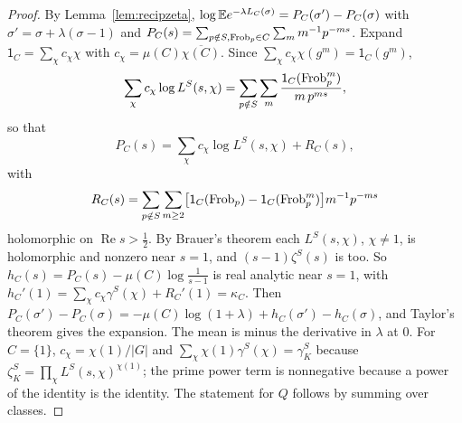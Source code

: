 \begin{proof}
By Lemma~\ref{lem:recipzeta}, $\log\mathbb{E} e^{-\lambda L_C(\sigma)}=P_C(\sigma')-P_C(\sigma)$ with $\sigma'=\sigma+\lambda(\sigma-1)$ and $P_C(s)=\sum_{p\notin S,\operatorname{Frob}_p\in C}\sum_mm^{-1}p^{-ms}$. Expand $\mathsf 1_C=\sum_\chi c_\chi\chi$ with $c_\chi=\mu(C)\overline{\chi(C)}$. Since $\sum_\chi c_\chi\chi(g^m)=\mathsf 1_C(g^m)$,
\[
\sum_\chi c_\chi\log L^S(s,\chi)=\sum_{p\notin S}\sum_m\frac{\mathsf 1_C(\operatorname{Frob}_p^m)}{m\,p^{ms}},
\]
so that
\[
P_C(s)=\sum_\chi c_\chi\log L^S(s,\chi)+R_C(s),
\]
with
\[
R_C(s)=\sum_{p\notin S}\sum_{m\ge2}\bigl[\mathsf 1_C(\operatorname{Frob}_p)-\mathsf 1_C(\operatorname{Frob}_p^m)\bigr]m^{-1}p^{-ms}
\]
holomorphic on $\operatorname{Re}s>\frac12$. By Brauer's theorem each $L^S(s,\chi)$, $\chi\ne1$, is holomorphic and nonzero near $s=1$, and $(s-1)\zeta^S(s)$ is too. So $h_C(s)=P_C(s)-\mu(C)\log\frac1{s-1}$ is real analytic near $s=1$, with $h_C'(1)=\sum_\chi c_\chi\gamma^S(\chi)+R_C'(1)=\kappa_C$. Then $P_C(\sigma')-P_C(\sigma)=-\mu(C)\log(1+\lambda)+h_C(\sigma')-h_C(\sigma)$, and Taylor's theorem gives the expansion. The mean is minus the derivative in $\lambda$ at $0$. For $C=\{1\}$, $c_\chi=\chi(1)/|G|$ and $\sum_\chi\chi(1)\gamma^S(\chi)=\gamma_K^S$ because $\zeta_K^S=\prod_\chi L^S(s,\chi)^{\chi(1)}$; the prime power term is nonnegative because a power of the identity is the identity. The statement for $Q$ follows by summing over classes.
\end{proof}

